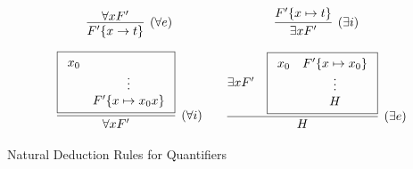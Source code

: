 \begin{table}[hbt]
	\begin{gather*}
	\begin{array}{ccc}
	\infer[(\forall e)]{F'\{x\to t\}}{
		\forall x F'
	}
	&&
		\infer[(\exists i)]{\exists x F'}{
		F'\{x\mapsto t \}
	}
	\\[1em]
	\infer[(\forall i)]{\forall x F'}{
		\boxed{
			\begin{array}{cc}
				x_0
				\\
				&\vdots
				\\
				&F' \{x\mapsto x_0 x\}
			\end{array}} %
	}
	&&
	\infer[(\exists e)]{H}{
		\exists x F' &
		\boxed{
			\begin{array}{cc}
				x_0
				&F' \{ x\mapsto x_0 \}
				\\
				&\vdots
				\\
				&H
			\end{array}} %
	}
	\end{array}
	\end{gather*}
	\caption{Natural Deduction Rules for Quantifiers}\label{tab:natural:deduction:quantifiers}
\end{table}